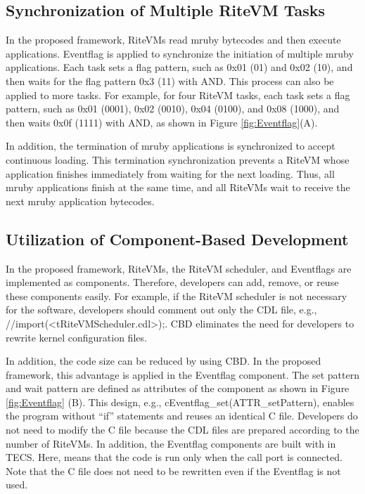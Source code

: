 \documentclass{sig-alternate-05-2015}
\begin{document}
\subsection{Synchronization of Multiple RiteVM Tasks}
In the proposed framework, RiteVMs read mruby bytecodes and then execute applications.
Eventflag is applied to synchronize the initiation of multiple mruby applications.
Each task sets a flag pattern, such as 0x01 (01) and 0x02 (10), and then waits for the flag pattern 0x3 (11) with AND.
This process can also be applied to more tasks.
For example, for four RiteVM tasks, each task sets a flag pattern, such as 0x01 (0001), 0x02 (0010), 0x04 (0100), and 0x08 (1000), and then waits 0x0f (1111) with AND, as shown in Figure \ref{fig:Eventflag}(A).

In addition, the termination of mruby applications is synchronized to accept continuous loading.
This termination synchronization prevents a RiteVM whose application finishes immediately from waiting for the next loading.
Thus, all mruby applications finish at the same time, and all RiteVMs wait to receive the next mruby application bytecodes. 

 
\subsection{Utilization of Component-Based Development}
In the proposed framework, RiteVMs, the RiteVM scheduler, and Eventflags are implemented as components.
Therefore, developers can add, remove, or reuse these components easily.
For example, if the RiteVM scheduler is not necessary for the software, developers should comment out only the CDL file, e.g., {\myit //import(<tRiteVMScheduler.cdl>);}.
CBD eliminates the need for developers to rewrite kernel configuration files.

In addition, the code size can be reduced by using CBD. 
In the proposed framework, this advantage is applied in the Eventflag component.
The set pattern and wait pattern are defined as attributes of the component as shown in Figure \ref{fig:Eventflag} (B).
This design, e.g., {\myit cEventflag\_set(ATTR\_setPattern)}, enables the program without ``if'' statements and reuses an identical C file.
Developers do not need to modify the C file because the CDL files are prepared according to the number of RiteVMs.
In addition, the Eventflag components are built with {\myit [optional]} in TECS.
Here, {\myit [optional]} means that the code is run only when the call port is connected.
Note that the C file does not need to be rewritten even if the Eventflag is not used. 
\end{document}
